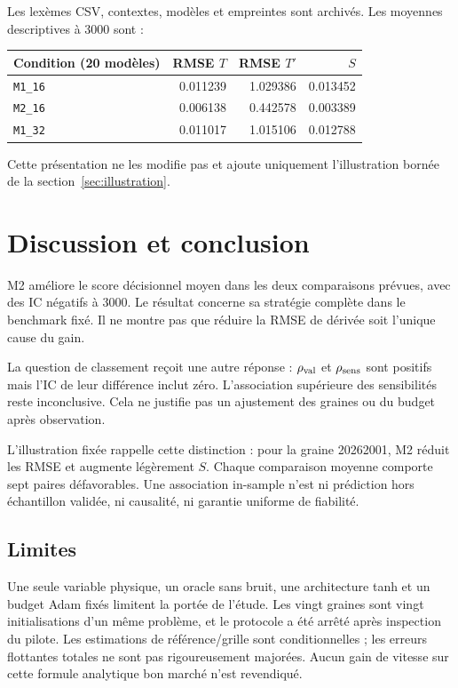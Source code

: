 \documentclass[11pt,a4paper]{article}
\newcommand{\Mone}{\texttt{M1\_16}}\newcommand{\Mtwo}{\texttt{M2\_16}}
\newcommand{\Mthree}{\texttt{M1\_32}}\newcommand{\That}{\widehat T_\theta}
\begin{document}
Les lexèmes CSV, contextes, modèles et empreintes sont archivés.
Les moyennes descriptives à 3000 sont :
\begin{center}
\begin{tabular}{lrrr}
\toprule
Condition (20 modèles) & RMSE $T$ & RMSE $T'$ & $S$\\
\midrule
\Mone & 0.011239 & 1.029386 & 0.013452\\
\Mtwo & 0.006138 & 0.442578 & 0.003389\\
\Mthree & 0.011017 & 1.015106 & 0.012788\\
\bottomrule
\end{tabular}
\end{center}
Cette présentation ne les modifie pas et ajoute uniquement l'illustration
bornée de la section~\ref{sec:illustration}.

\clearpage
\section{Discussion et conclusion}
M2 améliore le score décisionnel moyen dans les deux comparaisons prévues,
avec des IC négatifs à 3000. Le résultat concerne sa stratégie complète
dans le benchmark fixé. Il ne montre pas que réduire la RMSE de dérivée
soit l'unique cause du gain.

La question de classement reçoit une autre réponse :
$\rho_{\rm val}$ et $\rho_{\rm sens}$ sont positifs mais l'IC de leur
différence inclut zéro. L'association supérieure des sensibilités
reste inconclusive. Cela ne justifie pas un ajustement des graines
ou du budget après observation.

L'illustration fixée rappelle cette distinction : pour la graine 20262001,
M2 réduit les RMSE et augmente légèrement $S$.
Chaque comparaison moyenne comporte sept paires défavorables.
Une association in-sample n'est ni prédiction hors échantillon validée,
ni causalité, ni garantie uniforme de fiabilité.

\subsection{Limites}
Une seule variable physique, un oracle sans bruit, une architecture tanh
et un budget Adam fixés limitent la portée de l'étude.
Les vingt graines sont vingt initialisations d'un même problème,
et le protocole a été arrêté après inspection du pilote.
Les estimations de référence/grille sont conditionnelles ; les erreurs
flottantes totales ne sont pas rigoureusement majorées.
Aucun gain de vitesse sur cette formule analytique bon marché n'est revendiqué.
\end{document}
